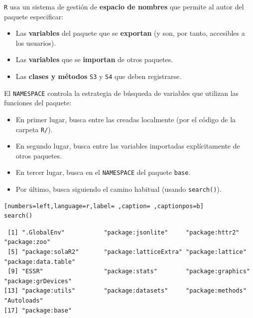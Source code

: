 \texttt{R} usa un sistema de gestión de \textbf{espacio de nombres} que permite al autor del paquete especificar:
\begin{itemize}
\item Las \textbf{variables} del paquete que se \textbf{exportan} (y son, por tanto, accesibles a los usuarios).
\item Las \textbf{variables} que se \textbf{importan} de otros paquetes.
\item Las \textbf{clases y métodos} \texttt{S3} y \texttt{S4} que deben registrarse.
\end{itemize}

El \texttt{NAMESPACE} controla la estrategia de búsqueda de variables que utilizan las funciones del paquete:
\begin{itemize}
\item En primer lugar, busca entre las creadas localmente (por el código de la carpeta \texttt{R/}).
\item En segundo lugar, busca entre las variables importadas explícitamente de otros paquetes.
\item En tercer lugar, busca en el \texttt{NAMESPACE} del paquete \texttt{base}.
\item Por último, busca siguiendo el camino habitual (usando \texttt{search()}).
\end{itemize}
\begin{lstlisting}[numbers=left,language=r,label= ,caption= ,captionpos=b]
search()
\end{lstlisting}

\begin{verbatim}
 [1] ".GlobalEnv"           "package:jsonlite"     "package:httr2"        "package:zoo"         
 [5] "package:solaR2"       "package:latticeExtra" "package:lattice"      "package:data.table"  
 [9] "ESSR"                 "package:stats"        "package:graphics"     "package:grDevices"   
[13] "package:utils"        "package:datasets"     "package:methods"      "Autoloads"           
[17] "package:base"
\end{verbatim}


